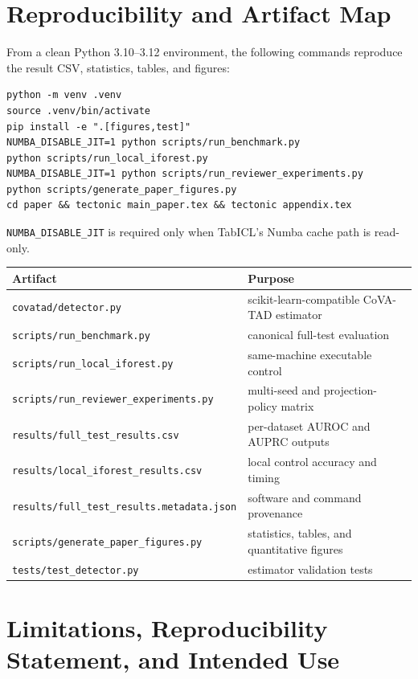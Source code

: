 \documentclass{article}
\begin{document}
\section{Reproducibility and Artifact Map}
\label{app:reproducibility}

From a clean Python 3.10--3.12 environment, the following commands reproduce the result CSV, statistics, tables, and figures:
\begin{verbatim}
python -m venv .venv
source .venv/bin/activate
pip install -e ".[figures,test]"
NUMBA_DISABLE_JIT=1 python scripts/run_benchmark.py
python scripts/run_local_iforest.py
NUMBA_DISABLE_JIT=1 python scripts/run_reviewer_experiments.py
python scripts/generate_paper_figures.py
cd paper && tectonic main_paper.tex && tectonic appendix.tex
\end{verbatim}
\texttt{NUMBA\_DISABLE\_JIT} is required only when TabICL's Numba cache path is read-only.

\begin{center}
\begin{tabular}{ll}
\toprule
Artifact & Purpose\\
\midrule
\texttt{covatad/detector.py} & scikit-learn-compatible CoVA-TAD estimator\\
\texttt{scripts/run\_benchmark.py} & canonical full-test evaluation\\
\texttt{scripts/run\_local\_iforest.py} & same-machine executable control\\
\texttt{scripts/run\_reviewer\_experiments.py} & multi-seed and projection-policy matrix\\
\texttt{results/full\_test\_results.csv} & per-dataset AUROC and AUPRC outputs\\
\texttt{results/local\_iforest\_results.csv} & local control accuracy and timing\\
\texttt{results/full\_test\_results.metadata.json} & software and command provenance\\
\texttt{scripts/generate\_paper\_figures.py} & statistics, tables, and quantitative figures\\
\texttt{tests/test\_detector.py} & estimator validation tests\\
\bottomrule
\end{tabular}
\end{center}

\section{Limitations, Reproducibility Statement, and Intended Use}
\label{app:limitations}
\end{document}
